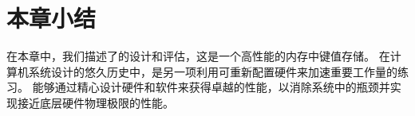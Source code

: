 \section{本章小结}
\label{kvdirect:sec:conclusion}


在本章中，我们描述了\oursys {}的设计和评估，这是一个高性能的内存中键值存储。 在计算机系统设计的悠久历史中，\oursys {}是另一项利用可重新配置硬件来加速重要工作量的练习。 \oursys {}能够通过精心设计硬件和软件来获得卓越的性能，以消除系统中的瓶颈并实现接近底层硬件物理极限的性能。

\iffalse
\textbf{从网络到数据结构}
\fi